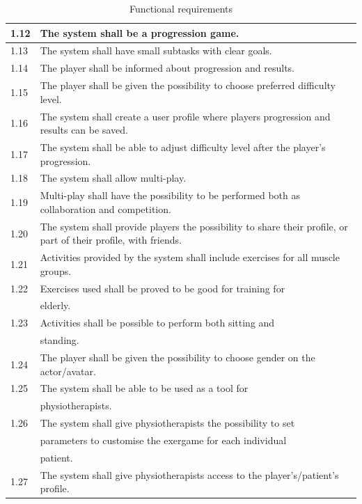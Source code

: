 \begin{table} [H]
\centering
\begin{tabular}{|>{\raggedright}p{}|p{}|}
\hline
1.12 & The system shall be a progression game.\\ \hline
1.13 & The system shall have small subtasks with clear goals.\\ \hline
1.14 & The player shall be informed about progression and results.\\ \hline
1.15 & The player shall be given the possibility to choose preferred difficulty level.\\ \hline
1.16 & The system shall create a user profile where players progression and results can be saved.\\ \hline
1.17 & The system shall be able to adjust difficulty level after the player's progression.\\ \hline
1.18 & The system shall allow multi-play.\\ \hline
1.19 & Multi-play shall have the possibility to be performed both as collaboration and competition.\\ \hline
1.20 & The system shall provide players the possibility to share their profile, or part of their profile, with friends. \\ \hline
1.21 & Activities provided by the system shall include exercises for all muscle groups.\\ \hline
1.22 & Exercises used shall be proved to be good for training for \\ & elderly.\\ \hline
1.23 & Activities shall be possible to perform both sitting and \\ & standing. \\ \hline
1.24 & The player shall be given the possibility to choose gender on the actor/avatar. \\ \hline
1.25 & The system shall be able to be used as a tool for \\ & physiotherapists.\\ \hline
1.26 & The system shall give physiotherapists the possibility to set \\ & parameters to customise the exergame for each individual \\ & patient.\\ \hline
1.27 & The system shall give physiotherapists access to the player's/patient's profile. \\ \hline  
\end{tabular}
\caption[Functional requirements, part 2]{Functional requirements}
\label{tab:func2}
\end{table} 

